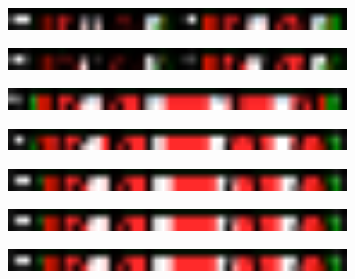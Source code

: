 \documentclass{article}%
\begin{document}
%


\begin{figure}[htbp]%
\centering%
\includegraphics[width=0.8\textwidth]{Fig3.png}%
\end{figure}

%


\begin{figure}[htbp]%
\centering%
\includegraphics[width=0.8\textwidth]{Fig4.png}%
\end{figure}

%


\begin{figure}[htbp]%
\centering%
\includegraphics[width=0.8\textwidth]{Fig5.png}%
\end{figure}

%


\begin{figure}[htbp]%
\centering%
\includegraphics[width=0.8\textwidth]{Fig6.png}%
\end{figure}

%


\begin{figure}[htbp]%
\centering%
\includegraphics[width=0.8\textwidth]{Fig7.png}%
\end{figure}

%


\begin{figure}[htbp]%
\centering%
\includegraphics[width=0.8\textwidth]{Fig8.png}%
\end{figure}

%


\begin{figure}[htbp]%
\centering%
\includegraphics[width=0.8\textwidth]{Fig9.png}%
\end{figure}

%
\end{document}
